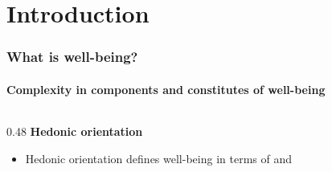 \documentclass[
	aspectratio=169, %
	t, %
	onlytextwidth, %
	10pt, %
]{beamer}
\begin{document}
\section{Introduction}
\begin{frame}
	\frametitle{What is well-being?}
	\framesubtitle{Complexity in components and constitutes of well-being}
	\pause
	\begin{columns}[T] %
		\begin{column}{0.48\linewidth} %
			\textbf{Hedonic orientation}\\
			\begin{itemize}
				\item  Hedonic orientation defines well-being in terms of  and 
				

\end{itemize}
\end{column}
\end{columns}
\end{frame}
\end{document}
